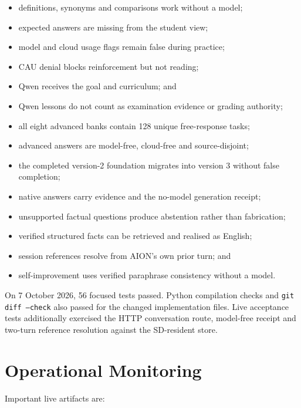 \documentclass[11pt,a4paper]{article}
\begin{document}
\begin{itemize}
  \item definitions, synonyms and comparisons work without a model;
  \item expected answers are missing from the student view;
  \item model and cloud usage flags remain false during practice;
  \item CAU denial blocks reinforcement but not reading;
  \item Qwen receives the goal and curriculum; and
  \item Qwen lessons do not count as examination evidence or grading authority;
  \item all eight advanced banks contain 128 unique free-response tasks;
  \item advanced answers are model-free, cloud-free and source-disjoint;
  \item the completed version-2 foundation migrates into version 3 without false completion;
  \item native answers carry evidence and the no-model generation receipt;
  \item unsupported factual questions produce abstention rather than fabrication;
  \item verified structured facts can be retrieved and realised as English;
  \item session references resolve from AION's own prior turn; and
  \item self-improvement uses verified paraphrase consistency without a model.
\end{itemize}

On 7 October 2026, 56 focused tests passed. Python compilation checks and
\texttt{git diff --check} also passed for the changed implementation files. Live acceptance
tests additionally exercised the HTTP conversation route, model-free receipt and two-turn
reference resolution against the SD-resident store.

\section{Operational Monitoring}

Important live artifacts are:
\end{document}
